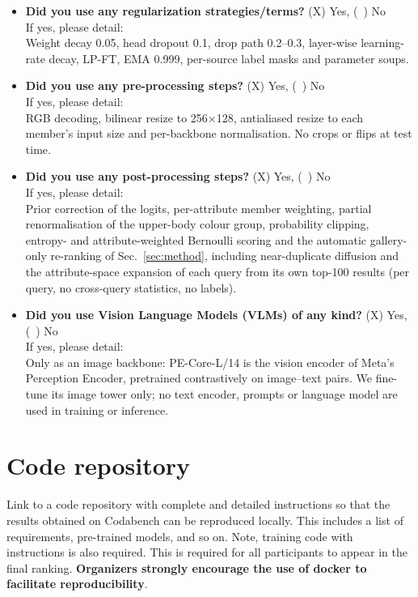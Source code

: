 \documentclass[a4paper, 10pt, conference]{ieeeconf}
\begin{document}
\begin{itemize}
\item \textbf{Did you use any regularization strategies/terms?} (X) Yes, (~) No\\
If yes, please detail:\\
Weight decay 0.05, head dropout 0.1, drop path 0.2--0.3, layer-wise learning-rate decay, LP-FT, EMA 0.999, per-source label masks and parameter soups.
%
%


\item \textbf{Did you use any pre-processing steps?} (X) Yes, (~) No\\
If yes, please detail:\\
RGB decoding, bilinear resize to 256$\times$128, antialiased resize to each member's input size and per-backbone normalisation. No crops or flips at test time.
%
%


\item \textbf{Did you use any post-processing steps?} (X) Yes, (~) No\\
If yes, please detail:\\
Prior correction of the logits, per-attribute member weighting, partial renormalisation of the upper-body colour group, probability clipping, entropy- and attribute-weighted Bernoulli scoring and the automatic gallery-only re-ranking of Sec.~\ref{sec:method}, including near-duplicate diffusion and the attribute-space expansion of each query from its own top-100 results (per query, no cross-query statistics, no labels).
%
%


\item \textbf{Did you use Vision Language Models (VLMs) of any kind?} (X) Yes, (~) No\\
If yes, please detail:\\
Only as an image backbone: PE-Core-L/14 is the vision encoder of Meta's Perception Encoder, pretrained contrastively on image--text pairs. We fine-tune its image tower only; no text encoder, prompts or language model are used in training or inference.
%
%
\end{itemize}



\section{Code repository}\label{sec:code}
Link to a code repository with complete and detailed instructions so that the results obtained on Codabench can be reproduced locally. This includes a list of requirements, pre-trained models, and so on. Note, training code with instructions is also required. This is required for all participants to appear in the final ranking. \textbf{Organizers strongly encourage the use of docker to facilitate reproducibility}. \\
\end{document}
